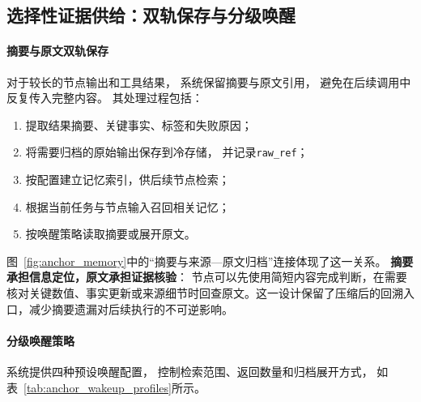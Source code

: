 \subsection{选择性证据供给：双轨保存与分级唤醒}

\paragraph{摘要与原文双轨保存}

对于较长的节点输出和工具结果，
系统保留摘要与原文引用，
避免在后续调用中反复传入完整内容。
其处理过程包括：
\begin{enumerate}
    \item 提取结果摘要、关键事实、标签和失败原因；
    \item 将需要归档的原始输出保存到冷存储，
          并记录\texttt{raw\_ref}；
    \item 按配置建立记忆索引，供后续节点检索；
    \item 根据当前任务与节点输入召回相关记忆；
    \item 按唤醒策略读取摘要或展开原文。
\end{enumerate}

图~\ref{fig:anchor_memory}中的“摘要与来源---原文归档”连接体现了这一关系。
\textbf{摘要承担信息定位，原文承担证据核验}：
节点可以先使用简短内容完成判断，在需要核对关键数值、事实更新或来源细节时回查原文。这一设计保留了压缩后的回溯入口，减少摘要遗漏对后续执行的不可逆影响。

\paragraph{分级唤醒策略}

系统提供四种预设唤醒配置，
控制检索范围、返回数量和归档展开方式，
如表~\ref{tab:anchor_wakeup_profiles}所示。


